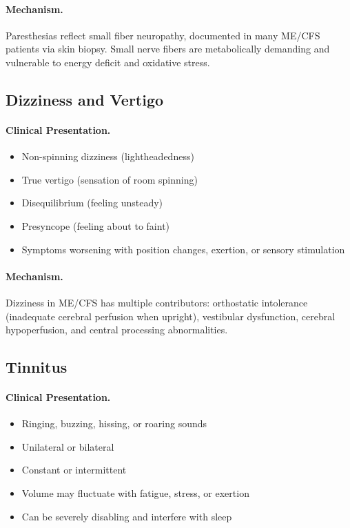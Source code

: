 \paragraph{Mechanism.}
Paresthesias reflect small fiber neuropathy, documented in many ME/CFS patients via skin biopsy. Small nerve fibers are metabolically demanding and vulnerable to energy deficit and oxidative stress.

\subsection{Dizziness and Vertigo}
\label{subsec:dizziness}

\paragraph{Clinical Presentation.}
\begin{itemize}
    \item Non-spinning dizziness (lightheadedness)
    \item True vertigo (sensation of room spinning)
    \item Disequilibrium (feeling unsteady)
    \item Presyncope (feeling about to faint)
    \item Symptoms worsening with position changes, exertion, or sensory stimulation
\end{itemize}

\paragraph{Mechanism.}
Dizziness in ME/CFS has multiple contributors: orthostatic intolerance (inadequate cerebral perfusion when upright), vestibular dysfunction, cerebral hypoperfusion, and central processing abnormalities.

\subsection{Tinnitus}
\label{subsec:tinnitus}

\paragraph{Clinical Presentation.}
\begin{itemize}
    \item Ringing, buzzing, hissing, or roaring sounds
    \item Unilateral or bilateral
    \item Constant or intermittent
    \item Volume may fluctuate with fatigue, stress, or exertion
    \item Can be severely disabling and interfere with sleep
\end{itemize}

